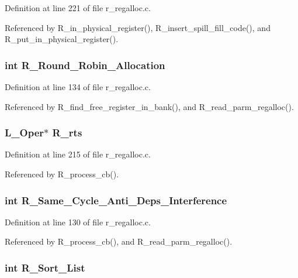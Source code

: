 Definition at line 221 of file r\_\-regalloc.c.

Referenced by R\_\-in\_\-physical\_\-register(), R\_\-insert\_\-spill\_\-fill\_\-code(), and R\_\-put\_\-in\_\-physical\_\-register().
\subsubsection{\setlength{\rightskip}{0pt plus 5cm}int \bf{R\_\-Round\_\-Robin\_\-Allocation}}\label{r__regalloc_8h_0b4893f94d0a988fc0b549ef95004f68}




Definition at line 134 of file r\_\-regalloc.c.

Referenced by R\_\-find\_\-free\_\-register\_\-in\_\-bank(), and R\_\-read\_\-parm\_\-regalloc().
\subsubsection{\setlength{\rightskip}{0pt plus 5cm}L\_\-Oper$\ast$ \bf{R\_\-rts}}\label{r__regalloc_8h_844ae0cf78616c8d50d0cd640dda9fee}




Definition at line 215 of file r\_\-regalloc.c.

Referenced by R\_\-process\_\-cb().
\subsubsection{\setlength{\rightskip}{0pt plus 5cm}int \bf{R\_\-Same\_\-Cycle\_\-Anti\_\-Deps\_\-Interference}}\label{r__regalloc_8h_f0070d0fe96a6341fa456cacb106da14}




Definition at line 130 of file r\_\-regalloc.c.

Referenced by R\_\-process\_\-cb(), and R\_\-read\_\-parm\_\-regalloc().
\subsubsection{\setlength{\rightskip}{0pt plus 5cm}int \bf{R\_\-Sort\_\-List}}\label{r__regalloc_8h_78d0b71c172433da333fb17e769da0de}


